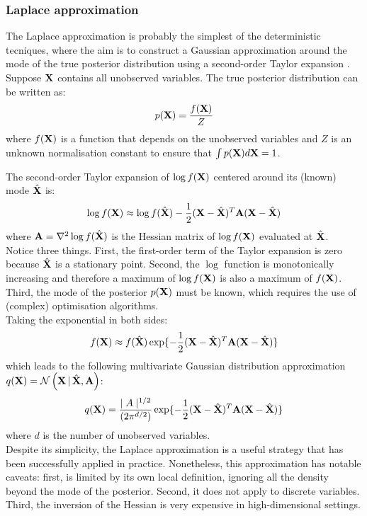 \subsubsection{Laplace approximation} \label{section:laplace_approximation}
The Laplace approximation is probably the simplest of the deterministic tecniques, where the aim is to construct a Gaussian approximation around the mode of the true posterior distribution using a second-order Taylor expansion \cite{Bishop,Murphy}.\\
Suppose ${\bf X}$ contains all unobserved variables. The true posterior distribution can be written as:
\[
p({\bf X}) = \frac{f({\bf X})}{Z}
\]
where $f({\bf X})$ is a function that depends on the unobserved variables and $Z$ is an unknown normalisation constant to ensure that $\int p({\bf X}) d{\bf X} = 1$.

The second-order Taylor expansion of $\log f({\bf X})$ centered around its (known) mode $\hat{{\bf X}}$ is: 
\[
	\log f({\bf X}) \approx \log f(\hat{{\bf X}}) - \frac{1}{2} ({\bf X}-\hat{{\bf X}})^T {\bf A} ({\bf X}-\hat{{\bf X}})
\]
where ${\bf A} = \nabla^2 \log f(\hat{{\bf X}})$ is the Hessian matrix of $\log f({\bf X})$ evaluated at $\hat{{\bf X}}$.\\
Notice three things. First, the first-order term of the Taylor expansion is zero because $\hat{{\bf X}}$ is a stationary point. Second, the $\log$ function is monotonically increasing and therefore a maximum of $\log f({\bf X})$ is also a maximum of $f({\bf X})$. Third, the mode of the posterior $p({\bf X})$ must be known, which requires the use of (complex) optimisation algorithms.\\
Taking the exponential in both sides:
\[
	f({\bf X}) \approx f(\hat{{\bf X}}) \exp\{ -\frac{1}{2} ({\bf X}-\hat{{\bf X}})^T {\bf A} ({\bf X}-\hat{{\bf X}}) \}
\]
which leads to the following multivariate Gaussian distribution approximation $q({\bf X}) = \mathcal{N}\left({\bf X} \,|\, \hat{{\bf X}},{\bf A}\right)$:
\[
	q({\bf X}) = \frac{\mid A \mid^{1/2}}{(2\pi^{d/2})} \exp\{ -\frac{1}{2} ({\bf X}-\hat{{\bf X}})^T {\bf A} ({\bf X}-\hat{{\bf X}}) \}
\]
where $d$ is the number of unobserved variables. \\
Despite its simplicity, the Laplace approximation is a useful strategy that has been successfully applied in practice. Nonetheless, this approximation has notable caveats: first, is limited by its own local definition, ignoring all the density beyond the mode of the posterior. Second, it does not apply to discrete variables. Third, the inversion of the Hessian is very expensive in high-dimensional settings.

